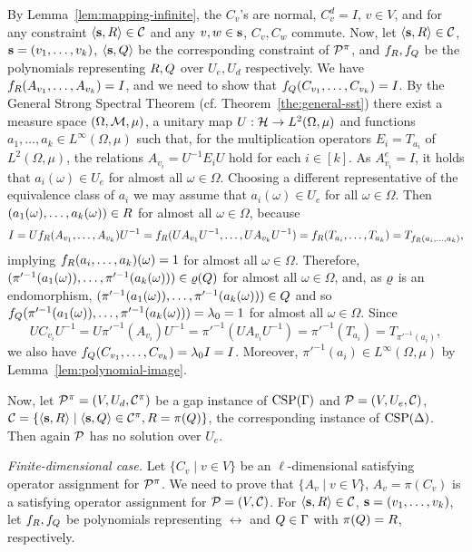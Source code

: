 By Lemma~\ref{lem:mapping-infinite}, the $C_v$'s are normal, $C_v^d=I$, $v\in V$,
and for any constraint $\langle {\bf s},R \rangle\in{\mathcal C}$ and any $v,w\in{\bf s}$, $C_v,C_w$ commute.
Now, let $\langle {\bf s},R \rangle\in{\mathcal C}$, ${\bf s}=(v _1,\ldots, v _{k})$, $\langle {\bf s},Q \rangle$ be the
corresponding constraint of ${\mathcal P}^\pi$, and $f_R,f_Q$ be the polynomials representing $R,Q$ over $U_e,U_d$ respectively. We have $f_R(A_{v_1},\ldots, A_{v_k})=I$, and we need to show that $f_Q(C_{v_1},\ldots, C_{v_k})=I$. By the General Strong Spectral Theorem (cf. Theorem~\ref{the:general-sst}) there exist a measure space $(\Omega,{\mathcal M},\mu)$, a unitary map $U:{\mathcal H}\to L^2(\Omega,\mu)$ and functions $a_1,\dots,a_k\in L^\infty(\Omega,\mu)$ such that, for the multiplication operators $E_i = T_{a_i}$ of $L^2(\Omega,\mu)$, the relations $A_{v_i} = U^{-1} E_iU$ hold for each $i\in [k]$. As $A_{v_i}^e=I$, it holds that $a_i(\omega)\in U_e$ for almost all $\omega\in\Omega$. Choosing a different representative of the equivalence class of $a_i$ we may assume that $a_i(\omega)\in U_e$ for all $\omega\in\Omega$. Then $(a_1(\omega),\ldots, a_k(\omega))\in R$ for almost all $\omega\in\Omega$, because
\[
I=Uf_R(A_{v_1},\ldots, A_{v_k})U^{-1}=f_R(UA_{v_1}U^{-1},\ldots, UA_{v_k}U^{-1})= f_R(T_{a_i},\ldots, T_{a_k})=T_{f_R(a_i,\ldots, a_k)},
\]
implying $f_R(a_i,\ldots, a_k)(\omega)=1$ for almost all $\omega\in\Omega$. Therefore, $(\pi'^{-1}(a_1(\omega)),\ldots, \pi'^{-1}(a_k(\omega)))\in\varrho(Q)$ for almost all $\omega\in\Omega$, and, as $\varrho$ is an endomorphism, $(\pi'^{-1}(a_1(\omega)),\ldots, \pi'^{-1}(a_k(\omega)))\in Q$ and so $f_Q(\pi'^{-1}(a_1(\omega)),\ldots, \pi'^{-1}(a_k(\omega)))=\lambda_0=1$ for almost all $\omega\in\Omega$. Since 
\[
UC_{v_i}U^{-1}=U\pi'^{-1}(A_{v_i})U^{-1}=\pi'^{-1}(UA_{v_i}U^{-1})=\pi'^{-1}(T_{a_i})=T_{\pi'^{-1}(a_i)},
\]
we also have $f_Q(C_{v_1},\ldots, C_{v_k})=\lambda_0I=I$. Moreover, $\pi'^{-1}(a_i)\in L^\infty(\Omega,\mu)$ by Lemma~\ref{lem:polynomial-image}.

\smallskip

Now, let ${\mathcal P}^\pi=(V,U_d,{\mathcal C}^\pi)$ be a gap instance of ${\rm CSP}(\Gamma)$ and ${\mathcal P}=(V,U_e,{\mathcal C})$, ${\mathcal C}=\{\langle {\bf s},R \rangle\mid\langle {\bf s},Q \rangle\in{\mathcal C}^\pi,R=\pi(Q)\}$, the corresponding instance of ${\rm CSP}(\Delta)$. Then again ${\mathcal P}$ has no solution over $U_e$.

{\it Finite-dimensional case.}
Let $\{C_v\mid v\in V\}$ be an $\ell$-dimensional satisfying operator assignment for ${\mathcal P}^\pi$. We need to prove that $\{A_v\mid v\in V\}$, $A_v=\pi(C_v)$ is a satisfying operator assignment for ${\mathcal P}=(V,{\mathcal C})$. For $\langle {\bf s},R \rangle\in{\mathcal C}$, ${\bf s}=(v _1,\ldots, v _{k})$, let $f_R,f_Q$ be polynomials representing $\rel$ and $Q\in\Gamma$ with $\pi(Q)=R$, respectively. 

